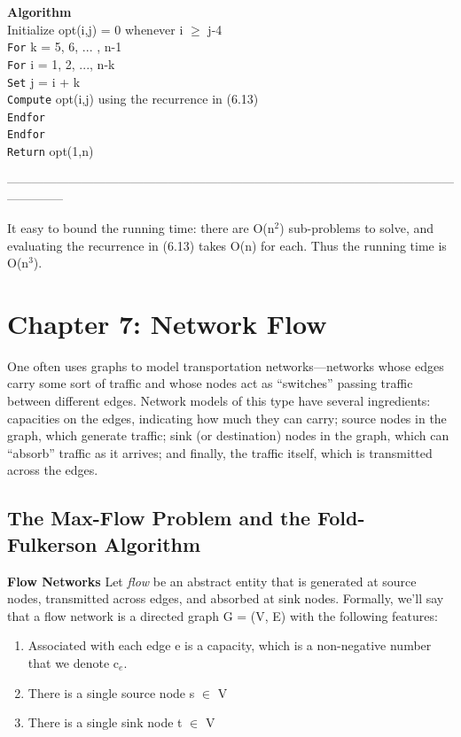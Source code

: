 \documentclass{article}
\begin{document}
\textbf{Algorithm}\\
Initialize opt(i,j) = 0 whenever i $\ge$ j-4\\
\texttt{For} k = 5, 6, ... , n-1\\
\texttt{For} i = 1, 2, ..., n-k\\
\texttt{Set} j = i + k\\
\texttt{Compute} opt(i,j) using the recurrence in (6.13)\\
\texttt{Endfor}\\
\texttt{Endfor}\\
\texttt{Return} opt(1,n)


\medskip
--------------------------------------------------------------------------------------------------------------------------
\medskip

It easy to bound the running time: there are O(n$^2$) sub-problems to solve, and evaluating the recurrence in (6.13) takes O(n) for each. Thus the running time is O(n$^3$). 

\section{Chapter 7: Network Flow}
One often uses graphs to model transportation networks—networks whose edges carry some sort of traffic and whose nodes act as “switches” passing traffic between different edges. Network models of this type have several ingredients: capacities on the edges, indicating how much they can carry; source nodes in the graph, which generate traffic; sink (or destination) nodes in the graph, which can “absorb” traffic as it arrives; and finally, the traffic itself, which is transmitted across the edges.\\

\subsection{The Max-Flow Problem and the Fold-Fulkerson Algorithm}

\textbf{Flow Networks} Let \emph{flow} be an abstract entity that is generated at source nodes, transmitted across edges, and absorbed at sink nodes. Formally, we’ll say that a flow network is a directed graph G = (V, E) with the following features:\\

\begin{enumerate}
    \item Associated with each edge e is a capacity, which is a non-negative number that we denote c$_e$.
    \item There is a single source node s $\in$ V
    \item There is a single sink node t $\in$ V
\end{enumerate}
\end{document}

